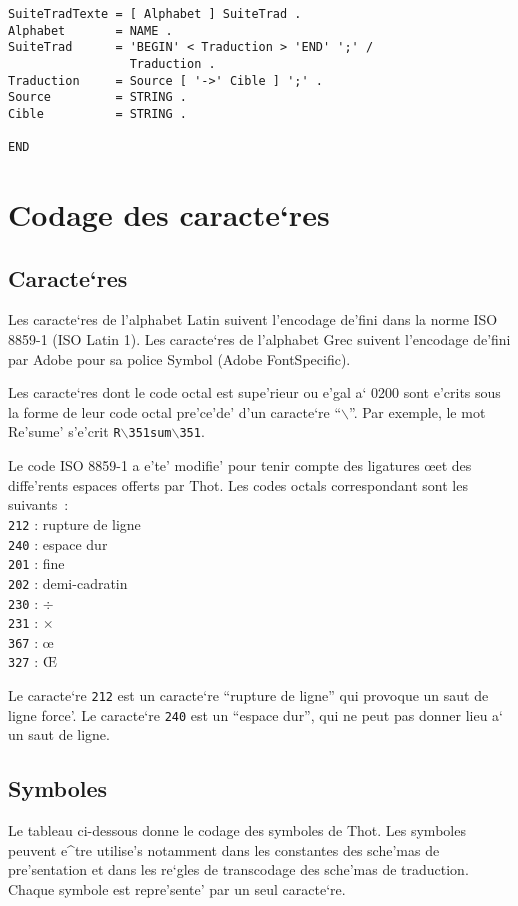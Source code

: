 {\begin{verbatim}
SuiteTradTexte = [ Alphabet ] SuiteTrad .
Alphabet       = NAME .
SuiteTrad      = 'BEGIN' < Traduction > 'END' ';' /
                 Traduction .
Traduction     = Source [ '->' Cible ] ';' .
Source         = STRING .
Cible          = STRING .

END
\end{verbatim}

\chapter{Codage des caracte`res}
\label{codage}

\section{Caracte`res}

Les caracte`res de l'alphabet Latin suivent l'encodage de'fini dans la norme
ISO 8859-1 (ISO Latin 1). Les caracte`res de l'alphabet Grec suivent
l'encodage de'fini par Adobe pour sa police Symbol (Adobe FontSpecific).

Les caracte`res dont le code octal est supe'rieur ou e'gal a` 0200 sont
e'crits sous la forme de leur code octal 
pre'ce'de' d'un caracte`re ``$\backslash$''. Par exemple, le mot Re'sume'
s'e'crit {\tt R$\backslash$351sum$\backslash$351}.

Le code ISO 8859-1 a e'te' modifie' pour tenir compte des ligatures
\oe et des diffe'rents espaces offerts par Thot. Les codes octals
correspondant sont les suivants~:\\
{\tt 212} : rupture de ligne\\
{\tt 240} : espace dur\\
{\tt 201} : fine\\
{\tt 202} : demi-cadratin\\
{\tt 230} : $\div$\\
{\tt 231} : $\times$\\
{\tt 367} : \oe\\
{\tt 327} : \OE 

Le caracte`re {\tt 212} est un caracte`re ``rupture de ligne'' qui provoque
un saut de ligne force'.
Le caracte`re {\tt 240} est un ``espace dur'', qui ne peut pas donner lieu a`
un saut de ligne.

\section{Symboles}
\label{codesymbole}

Le tableau ci-dessous donne le codage des symboles de Thot. Les symboles
peuvent e^tre utilise's notamment dans les constantes des sche'mas de
pre'sentation et dans les re`gles de transcodage des sche'mas de traduction.
Chaque symbole est repre'sente' par un seul caracte`re.

}
